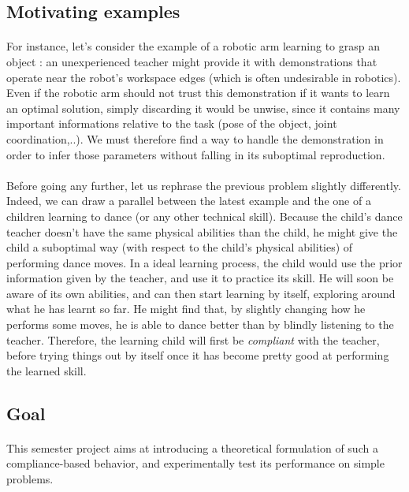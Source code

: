 \documentclass[a4paper]{report}
\begin{document}
{{			\subsection{Motivating examples}
			\paragraph{} For instance, let's consider the example of a robotic arm learning to grasp an object : an unexperienced teacher might provide it with demonstrations that operate near the robot's workspace edges (which is often undesirable in robotics). Even if the robotic arm should not trust this demonstration if it wants to learn an optimal solution, simply discarding it would be unwise, since it contains many important informations relative to the task (pose of the object, joint coordination,..). We must therefore find a way to handle the demonstration in order to infer those parameters without falling in its suboptimal reproduction. 
			
			\paragraph{} Before going any further, let us rephrase the previous problem slightly differently.  Indeed, we can draw a parallel between the latest example and the one of a children learning to dance (or any other technical skill). Because the child's dance teacher doesn't have the same physical abilities than the child, he might give the child a suboptimal way (with respect to the child's physical abilities) of performing dance moves. In a ideal learning process, the child would use the prior information given by the teacher, and use it to practice its skill. He will soon be aware of its own abilities, and can then start learning by itself, exploring around what he has learnt so far. He might find that, by slightly changing how he performs some moves,  he is able to dance better than by blindly listening to the teacher. Therefore, the learning child will first be \emph{compliant} with the teacher, before trying things out by itself once it has become pretty good at performing the learned skill. 
			
			\subsection{Goal}
			\paragraph{} This semester project aims at introducing a theoretical formulation of such a compliance-based behavior, and experimentally test its performance on simple problems.
			
}}
\end{document}
